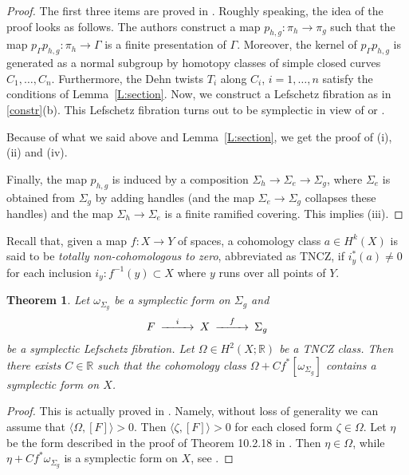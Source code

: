 \documentclass[12pt]{amsart}
\newcommand{\B}[1]{{\mathbb #1}}
\newcommand{\R}{\B R}
\newtheorem{theorem}[subsection]{Theorem}%
\theoremstyle{definition}
\theoremstyle{remark}
\numberwithin{figure}{section}
\numberwithin{table}{section}
\numberwithin{equation}{section}
\def\m{\medskip}
\newcommand{\Ga}{{\Gamma}}
\newcommand{\la}{{\lambda}}
\newcommand{\Si}{{\Sigma}}
\def\la{\langle}
\def\ra{\rangle}
\newcommand\lemref{Lemma~\ref}
\begin{document}
\begin{proof}The first three items are proved in \cite[Theorem A]{ABKP}. Roughly speaking, the idea of the proof looks as follows. The authors construct a map $p_{h,g}:\pi_h \to \pi_g$ such that the map $p_{\Ga}p_{h,g}: \pi_h \to \Ga$ is a finite presentation of $\Ga$. Moreover, the kernel of $p_{\Ga}p_{h,g}$ is generated as a normal subgroup by homotopy classes of simple closed curves $C_1, \ldots, C_n$. Furthermore, the Dehn twists $T_i$ along $C_i$, $i=1, \ldots, n$ satisfy the conditions of \lemref{L:section}. Now, we construct a Lefschetz fibration as in \ref{constr}(b). This Lefschetz fibration turns out to be symplectic in view of \cite[Theorem 10.2.18]{GS} or \cite[Proposition 2.3]{ABKP}.

Because of what we said above and \lemref{L:section}, we get the proof of (i), (ii) and (iv). 

Finally, the map $p_{h,g}$ is induced by a composition $\Si_h \to \Si_e\to \Si_g$, where $\Si_e$ is obtained from $\Si_g$ by adding handles (and the map $\Si_e\to \Si_g$ collapses these handles) and the map $\Si_h \to \Si_e$ is a finite ramified covering. This implies (iii).
\end{proof}

\m
Recall that, given a map $f:X \to Y$ of spaces, a cohomology class $a\in H^k(X)$ 
is said to be {\em totally non-cohomologous to zero}, abbreviated as  TNCZ, if 
$i_y^*(a)\neq 0$ for each inclusion $i_y:f^{-1}(y)\subset X$ where $y$ runs over 
all points of $Y$.

\begin{theorem}\label{theor:gs}
Let $\omega_{\Si_g}$ be a symplectic form on $\Si_g$ and 
$$
\CD
F @>i>>  X @>f>> \Si_g
\endCD
$$ 
be a symplectic Lefschetz fibration. Let $\Omega\in 
H^2(X;\R)$ be a  TNCZ class. Then there exists $C\in \R$ such 
that the cohomology class $\Omega+Cf^*[\omega_{\Si_g}]$ contains a symplectic 
form on $X$.
\end{theorem}

\begin{proof} This is actually proved in \cite[Theorem 10.2.18]{GS}. 
Namely, without loss of generality we can assume that $\la \Omega, [F]\ra >0$. 
Then $\la \zeta, [F]\ra >0$ for each closed form $\zeta\in \Omega$. Let $\eta$ 
be the form described in the proof of Theorem 10.2.18 in \cite{GS}. 
Then $\eta \in\Omega$, while $\eta +Cf^*\omega_{\Si_g}$ is a symplectic form on 
$X$, see \cite[Proposition 10.2.20]{GS}.
\end{proof} 
\end{document}

